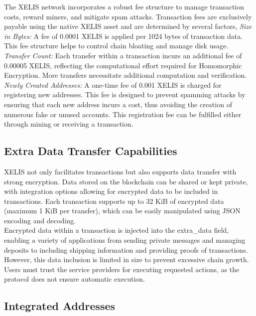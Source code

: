 \documentclass[10pt,a4paper,twocolumn]{article}
\begin{document}
The XELIS network incorporates a robust fee structure to manage transaction costs, reward miners, and mitigate spam attacks. Transaction fees are exclusively payable using the native XELIS asset and are determined by several factors, \textit{Size in Bytes:} A fee of 0.0001 XELIS is applied per 1024 bytes of transaction data. This fee structure helps to control chain bloating and manage disk usage.
\textit{Transfer Count: }Each transfer within a transaction incurs an additional fee of 0.00005 XELIS, reflecting the computational effort required for Homomorphic Encryption. More transfers necessitate additional computation and verification. \textit{Newly Created Addresses:} A one-time fee of 0.001 XELIS is charged for registering new addresses. This fee is designed to prevent spamming attacks by ensuring that each new address incurs a cost, thus avoiding the creation of numerous fake or unused accounts. This registration fee can be fulfilled either through mining or receiving a transaction.\\

\subsection{Extra Data Transfer Capabilities}

XELIS not only facilitates transactions but also supports data transfer with strong encryption. Data stored on the blockchain can be shared or kept private, with integration options allowing for encrypted data to be included in transactions. Each transaction supports up to 32 KiB of encrypted data (maximum 1 KiB per transfer), which can be easily manipulated using JSON encoding and decoding.\\

Encrypted data within a transaction is injected into the extra\_data field, enabling a variety of applications from sending private messages and managing deposits to including shipping information and providing proofs of transactions. However, this data inclusion is limited in size to prevent excessive chain growth. Users must trust the service providers for executing requested actions, as the protocol does not ensure automatic execution.\\

\subsection{Integrated Addresses}
\end{document}
